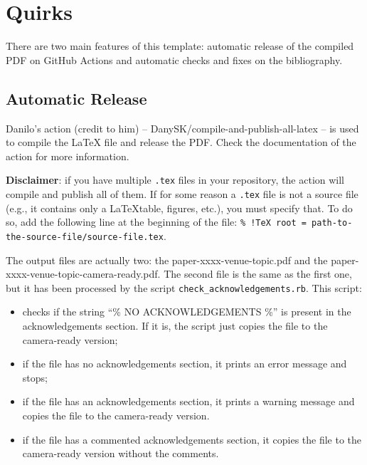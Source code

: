 \documentclass[final,5pt,times,twocolumn]{elsarticle}
\begin{document}
    \section{Quirks}\label{sec:quirks}
        There are two main features of this template: automatic release of the compiled PDF on GitHub Actions and automatic checks and fixes on the bibliography.
        \subsection{Automatic Release}\label{subsec:automatic-release}
            Danilo's action (credit to him) -- DanySK/compile-and-publish-all-latex -- is used to compile the \LaTeX{} file and release the PDF.
            Check the documentation of the action for more information.

            \textbf{Disclaimer}: if you have multiple \texttt{.tex} files in your repository, the action will compile and publish all of them.
            If for some reason a \texttt{.tex} file is not a source file (e.g., it contains only a \LaTeX table, figures, etc.), you must specify that.
            To do so, add the following line at the beginning of the file: \texttt{\% !TeX root = path-to-the-source-file/source-file.tex}.

            The output files are actually two: the paper-xxxx-venue-topic.pdf and the paper-xxxx-venue-topic-camera-ready.pdf.
            The second file is the same as the first one, but it has been processed by the script \texttt{check\_acknowledgements.rb}.
            This script:
            \begin{itemize}
                \item checks if the string ``\% NO ACKNOWLEDGEMENTS \%'' is present in the acknowledgements section.
                If it is, the script just copies the file to the camera-ready version;
                \item if the file has no acknowledgements section, it prints an error message and stops;
                \item if the file has an acknowledgements section, it prints a warning message and copies the file to the camera-ready version.
                \item if the file has a commented acknowledgements section, it copies the file to the camera-ready version without the comments.
            \end{itemize}
\end{document}
